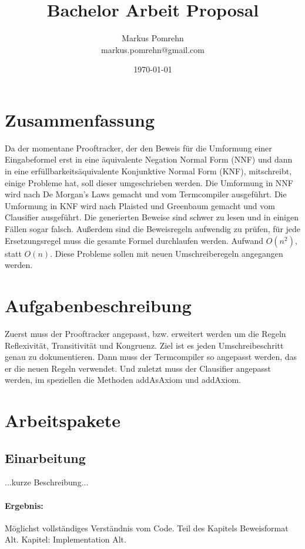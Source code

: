 \documentclass[a4paper]{article}
\title{Bachelor Arbeit Proposal}
\author{Markus Pomrehn\\{markus.pomrehn@gmail.com}}
\date{\today}
\begin{document}
\maketitle

\section{Zusammenfassung}

Da der momentane Prooftracker, der den Beweis für die Umformung einer Eingabeformel erst in eine äquivalente Negation Normal Form (NNF) und dann in eine erfüllbarkeitsäquivalente Konjunktive Normal Form (KNF), mitschreibt, einige Probleme hat, soll dieser umgeschrieben werden. Die Umformung in NNF wird nach De Morgan's Laws gemacht und vom Termcompiler ausgeführt. Die Umformung in KNF wird nach Plaisted und Greenbaum gemacht und vom Clausifier ausgeführt. Die generierten Beweise sind schwer zu lesen und in einigen Fällen sogar falsch. Außerdem sind die Beweisregeln aufwendig zu prüfen, für jede Ersetzungsregel muss die gesamte Formel durchlaufen werden. Aufwand $O(n^2)$, statt $O(n)$. Diese Probleme sollen mit neuen Umschreiberegeln angegangen werden.

\section{Aufgabenbeschreibung}

Zuerst muss der Prooftracker angepasst, bzw. erweitert werden um die Regeln Reflexivität, Transitivität und Kongruenz.
Ziel ist es jeden Umschreibeschritt genau zu dokumentieren. Dann muss der Termcompiler so angepasst werden, das er die neuen Regeln verwendet.
Und zuletzt muss der Clausifier angepasst werden, im speziellen die Methoden addAsAxiom und addAxiom.

\section{Arbeitspakete}

\subsection{Einarbeitung}

...kurze Beschreibung...

\paragraph{Ergebnis:}
Möglichst vollständiges Verständnis vom Code.
Teil des Kapitels Beweisformat Alt.
Kapitel: Implementation Alt.
\end{document}
